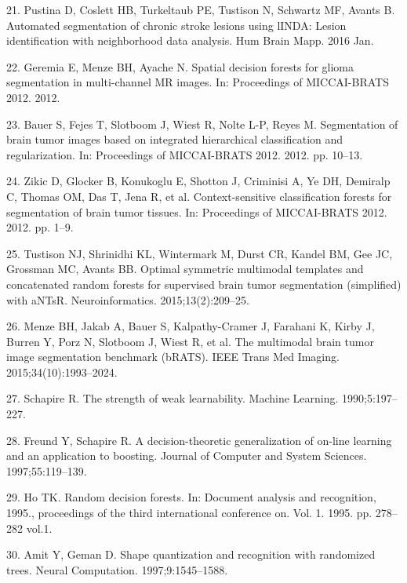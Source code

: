 \documentclass[11pt,]{article}
\begin{document}
\hypertarget{ref-Pustina:2016aa}{}
21. Pustina D, Coslett HB, Turkeltaub PE, Tustison N, Schwartz MF,
Avants B. Automated segmentation of chronic stroke lesions using lINDA:
Lesion identification with neighborhood data analysis. Hum Brain Mapp.
2016 Jan.

\hypertarget{ref-geremia2012}{}
22. Geremia E, Menze BH, Ayache N. Spatial decision forests for glioma
segmentation in multi-channel MR images. In: Proceedings of MICCAI-BRATS
2012. 2012.

\hypertarget{ref-bauer2012}{}
23. Bauer S, Fejes T, Slotboom J, Wiest R, Nolte L-P, Reyes M.
Segmentation of brain tumor images based on integrated hierarchical
classification and regularization. In: Proceedings of MICCAI-BRATS 2012.
2012. pp. 10--13.

\hypertarget{ref-zikic2012}{}
24. Zikic D, Glocker B, Konukoglu E, Shotton J, Criminisi A, Ye DH,
Demiralp C, Thomas OM, Das T, Jena R, et al. Context-sensitive
classification forests for segmentation of brain tumor tissues. In:
Proceedings of MICCAI-BRATS 2012. 2012. pp. 1--9.

\hypertarget{ref-Tustison:2015aa}{}
25. Tustison NJ, Shrinidhi KL, Wintermark M, Durst CR, Kandel BM, Gee
JC, Grossman MC, Avants BB. Optimal symmetric multimodal templates and
concatenated random forests for supervised brain tumor segmentation
(simplified) with aNTsR. Neuroinformatics. 2015;13(2):209--25.

\hypertarget{ref-Menze:2015aa}{}
26. Menze BH, Jakab A, Bauer S, Kalpathy-Cramer J, Farahani K, Kirby J,
Burren Y, Porz N, Slotboom J, Wiest R, et al. The multimodal brain tumor
image segmentation benchmark (bRATS). IEEE Trans Med Imaging.
2015;34(10):1993--2024.

\hypertarget{ref-schapire1990}{}
27. Schapire R. The strength of weak learnability. Machine Learning.
1990;5:197--227.

\hypertarget{ref-freund1997}{}
28. Freund Y, Schapire R. A decision-theoretic generalization of on-line
learning and an application to boosting. Journal of Computer and System
Sciences. 1997;55:119--139.

\hypertarget{ref-ho1995}{}
29. Ho TK. Random decision forests. In: Document analysis and
recognition, 1995., proceedings of the third international conference
on. Vol. 1. 1995. pp. 278--282 vol.1.

\hypertarget{ref-amit1997}{}
30. Amit Y, Geman D. Shape quantization and recognition with randomized
trees. Neural Computation. 1997;9:1545--1588.
\end{document}
